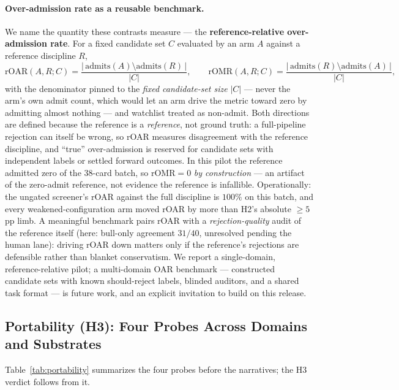 \documentclass[11pt]{article}
\begin{document}
\paragraph{Over-admission rate as a reusable benchmark.} We name the quantity these contrasts
measure --- the \textbf{reference-relative over-admission rate}. For a fixed candidate set $C$
evaluated by an arm $A$ against a reference discipline $R$,
\[
  \mathrm{rOAR}(A, R; C) = \frac{|\,\mathrm{admits}(A) \setminus \mathrm{admits}(R)\,|}{|C|},
  \qquad
  \mathrm{rOMR}(A, R; C) = \frac{|\,\mathrm{admits}(R) \setminus \mathrm{admits}(A)\,|}{|C|},
\]
with the denominator pinned to the \emph{fixed candidate-set size} $|C|$ --- never the arm's own
admit count, which would let an arm drive the metric toward zero by admitting almost nothing --- and
watchlist treated as non-admit. Both directions are defined because the reference is a
\emph{reference}, not ground truth: a full-pipeline rejection can itself be wrong, so rOAR measures
disagreement with the reference discipline, and ``true'' over-admission is reserved for candidate
sets with independent labels or settled forward outcomes. In this pilot the reference admitted zero
of the 38-card batch, so $\mathrm{rOMR} = 0$ \emph{by construction} --- an artifact of the zero-admit
reference, not evidence the reference is infallible. Operationally: the ungated screener's rOAR
against the full discipline is $100\%$ on this batch, and every weakened-configuration arm moved rOAR
by more than H2's absolute $\geq 5$\,pp limb. A meaningful benchmark pairs rOAR with a
\emph{rejection-quality} audit of the reference itself (here: bull-only agreement $31/40$, unresolved
pending the human lane): driving rOAR down matters only if the reference's rejections are defensible
rather than blanket conservatism. We report a single-domain, reference-relative pilot; a multi-domain
OAR benchmark --- constructed candidate sets with known should-reject labels, blinded auditors, and a
shared task format --- is future work, and an explicit invitation to build on this release.

\subsection{Portability (H3): Four Probes Across Domains and Substrates}

Table~\ref{tab:portability} summarizes the four probes before the narratives; the H3 verdict follows
from it.
\end{document}
